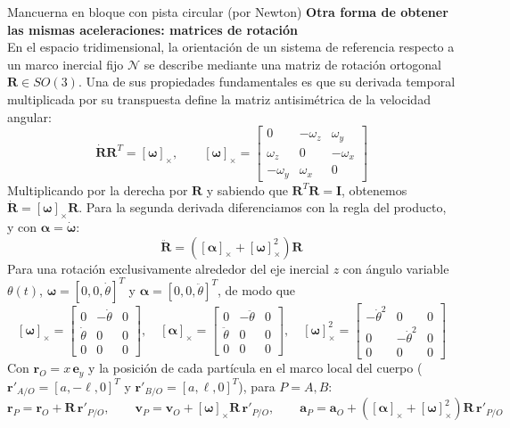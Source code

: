 \begin{solucion}{Mancuerna en bloque con pista circular (por Newton)}
\textbf{Otra forma de obtener las mismas aceleraciones: matrices de rotación}\\
En el espacio tridimensional, la orientación de un sistema de referencia respecto a un marco inercial fijo $\mathcal{N}$ se describe mediante una matriz de rotación ortogonal $\mathbf{R} \in SO(3)$. Una de sus propiedades fundamentales es que su derivada temporal multiplicada por su transpuesta define la matriz antisimétrica de la velocidad angular:
$$\dot{\mathbf{R}}\mathbf{R}^T = [\boldsymbol{\omega}]_\times, \qquad
[\boldsymbol{\omega}]_\times = \begin{bmatrix} 0 & -\omega_z & \omega_y \\ \omega_z & 0 & -\omega_x \\ -\omega_y & \omega_x & 0 \end{bmatrix}$$
Multiplicando por la derecha por $\mathbf{R}$ y sabiendo que $\mathbf{R}^T\mathbf{R} = \mathbf{I}$, obtenemos $\dot{\mathbf{R}} = [\boldsymbol{\omega}]_\times \mathbf{R}$. Para la segunda derivada diferenciamos con la regla del producto, y con $\boldsymbol{\alpha} = \dot{\boldsymbol{\omega}}$:
$$\ddot{\mathbf{R}} = \left( [\boldsymbol{\alpha}]_\times + [\boldsymbol{\omega}]_\times^2 \right) \mathbf{R}$$
Para una rotación exclusivamente alrededor del eje inercial $z$ con ángulo variable $\theta(t)$, $\boldsymbol{\omega} = [0, 0, \dot{\theta}]^T$ y $\boldsymbol{\alpha} = [0, 0, \ddot{\theta}]^T$, de modo que
$$[\boldsymbol{\omega}]_\times = \begin{bmatrix} 0 & -\dot{\theta} & 0 \\ \dot{\theta} & 0 & 0 \\ 0 & 0 & 0 \end{bmatrix}, \quad
[\boldsymbol{\alpha}]_\times = \begin{bmatrix} 0 & -\ddot{\theta} & 0 \\ \ddot{\theta} & 0 & 0 \\ 0 & 0 & 0 \end{bmatrix}, \quad
[\boldsymbol{\omega}]_\times^2 = \begin{bmatrix} -\dot{\theta}^2 & 0 & 0 \\ 0 & -\dot{\theta}^2 & 0 \\ 0 & 0 & 0 \end{bmatrix}$$
Con $\mathbf{r}_O = x\,\mathbf{e}_y$ y la posición de cada partícula en el marco local del cuerpo ($\mathbf{r}'_{A/O}=[a,-\ell,0]^T$ y $\mathbf{r}'_{B/O}=[a,\ell,0]^T$), para $P=A,B$:
$$\mathbf{r}_P = \mathbf{r}_O + \mathbf{R}\,\mathbf{r}'_{P/O}, \qquad
\mathbf{v}_P = \mathbf{v}_O + [\boldsymbol{\omega}]_\times \mathbf{R}\,\mathbf{r}'_{P/O}, \qquad
\mathbf{a}_P = \mathbf{a}_O + \left( [\boldsymbol{\alpha}]_\times + [\boldsymbol{\omega}]_\times^2 \right) \mathbf{R}\,\mathbf{r}'_{P/O}$$


\end{solucion}
